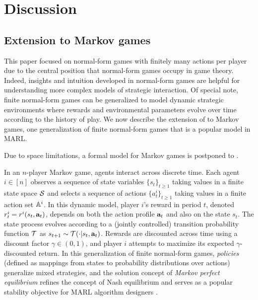 \section{Discussion} \label{sec:discussion}


\subsection*{Extension to Markov games}

This paper focused on normal-form games with finitely many actions per player due to the central position that normal-form games occupy in game theory. Indeed, insights and intuition developed in normal-form games are helpful for understanding more complex models of strategic interaction. Of special note, finite normal-form games can be generalized to model dynamic strategic environments where rewards and environmental parameters evolve over time according to the history of play. We now describe the extension of  to Markov games, one generalization of finite normal-form games that is a popular model in MARL. {Due to space limitations, a formal model for Markov games is postponed to . 

In an $n$-player Markov game, agents interact across discrete time. Each agent $i \in [n]$ observes a sequence of state variables $\{ s_t \}_{t \geq 1}$ taking values in a finite state space $\SS$ and selects a sequence of actions $\{ a^i_t \}_{t \geq 1}$ taking values in a finite action set $\aa^i$. In this dynamic model, player $i$'s reward in period $t$, denoted $r^i_t = r^i ( s_t, \ba_t )$, depends on both the action profile $\ba_t$ and also on the state $s_t$. The state process evolves according to a (jointly controlled) transition probability function $\TT$ as $s_{t+1} \sim \TT ( \cdot | s_t, \ba_t )$. Rewards are discounted across time using a discount factor $\gamma \in (0,1)$, and player $i$ attempts to maximize its expected $\gamma$-discounted return. In this generalization of finite normal-form games, \emph{policies} (defined as mappings from states to probability distributions over actions) generalize mixed strategies, and the solution concept of \emph{Markov perfect equilibrium} refines the concept of Nash equilibrium and serves as a popular stability objective for MARL algorithm designers \cite{zhang2021multi}. 

}
